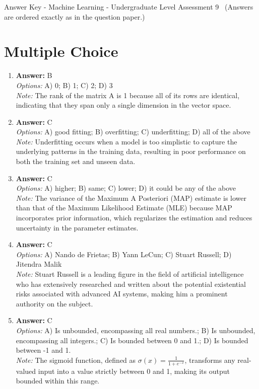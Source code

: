 \documentclass[12pt]{article}
\begin{document}
\begin{center}
Answer Key - Machine Learning - Undergraduate Level Assessment 9 \
\small (Answers are ordered exactly as in the question paper.)
\end{center}

\section*{Multiple Choice}
\begin{enumerate}[label=\arabic*.]
\item \textbf{Answer:} B
\\ \textit{Options:} A) 0; B) 1; C) 2; D) 3
\\ \textit{Note:} The rank of the matrix A is 1 because all of its rows are identical, indicating that they span only a single dimension in the vector space.
\item \textbf{Answer:} C
\\ \textit{Options:} A) good fitting; B) overfitting; C) underfitting; D) all of the above
\\ \textit{Note:} Underfitting occurs when a model is too simplistic to capture the underlying patterns in the training data, resulting in poor performance on both the training set and unseen data.
\item \textbf{Answer:} C
\\ \textit{Options:} A) higher; B) same; C) lower; D) it could be any of the above
\\ \textit{Note:} The variance of the Maximum A Posteriori (MAP) estimate is lower than that of the Maximum Likelihood Estimate (MLE) because MAP incorporates prior information, which regularizes the estimation and reduces uncertainty in the parameter estimates.
\item \textbf{Answer:} C
\\ \textit{Options:} A) Nando de Frietas; B) Yann LeCun; C) Stuart Russell; D) Jitendra Malik
\\ \textit{Note:} Stuart Russell is a leading figure in the field of artificial intelligence who has extensively researched and written about the potential existential risks associated with advanced AI systems, making him a prominent authority on the subject.
\item \textbf{Answer:} C
\\ \textit{Options:} A) Is unbounded, encompassing all real numbers.; B) Is unbounded, encompassing all integers.; C) Is bounded between 0 and 1.; D) Is bounded between -1 and 1.
\\ \textit{Note:} The sigmoid function, defined as \( \sigma(x) = \frac{1}{1 + e^{-x}} \), transforms any real-valued input into a value strictly between 0 and 1, making its output bounded within this range.
\end{enumerate}
\end{document}
